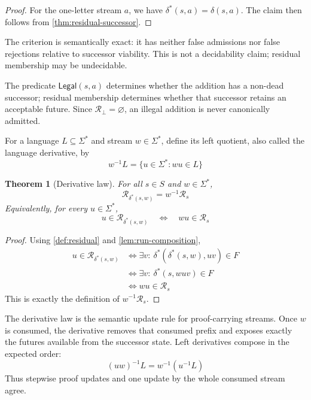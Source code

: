 \documentclass[11pt]{article}
\newtheorem{theorem}{Theorem}[section]
\theoremstyle{definition}
\newcommand{\States}{S}
\newcommand{\Additions}{\Sigma}
\newcommand{\Accept}{F}
\newcommand{\Run}{\delta^{*}}
\newcommand{\Residual}{\mathcal R}
\newcommand{\Legal}{\mathsf{Legal}}
\begin{document}
\begin{proof}
For the one-letter stream $a$, we have $\Run(s,a)=\delta(s,a)$. The claim then follows from \cref{thm:residual-successor}.
\end{proof}



The criterion is semantically exact: it has neither false admissions nor false rejections relative to successor viability. This is not a decidability claim; residual membership may be undecidable.

The predicate $\Legal(s,a)$ determines whether the addition has a non-dead successor; residual membership determines whether that successor retains an acceptable future. Since $\Residual_{\bot}=\varnothing$, an illegal addition is never canonically admitted.

For a language $L\subseteq\Additions^*$ and stream $w\in\Additions^*$, define its left quotient, also called the language derivative, by
\begin{equation}\label{eq:derivative}
  w^{-1}L=\{u\in\Additions^*:wu\in L\}
\end{equation}

\begin{theorem}[Derivative law]\label{thm:derivative}
For all $s\in\States$ and $w\in\Additions^*$,
\begin{equation}\label{eq:derivative-law}
  \boxed{
  \Residual_{\Run(s,w)}=w^{-1}\Residual_s}
\end{equation}
Equivalently, for every $u\in\Additions^*$,
\begin{equation}\label{eq:derivative-pointwise}
  u\in\Residual_{\Run(s,w)}
  \quad\Longleftrightarrow\quad
  wu\in\Residual_s
\end{equation}
\end{theorem}

\begin{proof}
Using \cref{def:residual} and \cref{lem:run-composition},
\[
\begin{aligned}
 u\in\Residual_{\Run(s,w)}
 &\Longleftrightarrow
   \exists v:\ \Run(\Run(s,w),uv)\in\Accept\\
 &\Longleftrightarrow
   \exists v:\ \Run(s,wuv)\in\Accept\\
 &\Longleftrightarrow wu\in\Residual_s
\end{aligned}
\]
This is exactly the definition of $w^{-1}\Residual_s$.
\end{proof}

The derivative law is the semantic update rule for proof-carrying streams. Once $w$ is consumed, the derivative removes that consumed prefix and exposes exactly the futures available from the successor state. Left derivatives compose in the expected order:
\[
  (uw)^{-1}L=w^{-1}(u^{-1}L)
\]
Thus stepwise proof updates and one update by the whole consumed stream agree.
\end{document}
